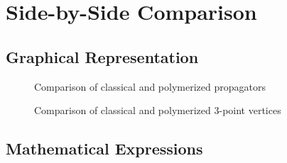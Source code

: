 \documentclass[11pt]{article}
\begin{document}
\section{Side-by-Side Comparison}

\subsection{Graphical Representation}

\begin{figure}[h]
\centering

\caption{Comparison of classical and polymerized propagators}
\label{fig:propagator-comparison}
\end{figure}

\begin{figure}[h]
\centering

\caption{Comparison of classical and polymerized 3-point vertices}
\label{fig:vertex-comparison}
\end{figure}

\subsection{Mathematical Expressions}
\end{document}

